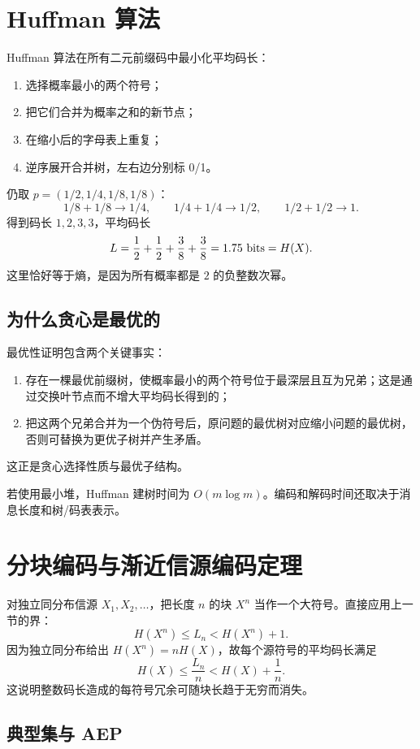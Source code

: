 \section{Huffman 算法}

Huffman 算法在所有二元前缀码中最小化平均码长：
\begin{enumerate}
  \item 选择概率最小的两个符号；
  \item 把它们合并为概率之和的新节点；
  \item 在缩小后的字母表上重复；
  \item 逆序展开合并树，左右边分别标 0/1。
\end{enumerate}

\begin{example}[完整 Huffman 计算]
仍取 $p=(1/2,1/4,1/8,1/8)$：
\[
1/8+1/8\to1/4,
\qquad
1/4+1/4\to1/2,
\qquad
1/2+1/2\to1.
\]
得到码长 $1,2,3,3$，平均码长
\[
L=\frac12+\frac12+\frac38+\frac38=1.75\text{ bits}=H(X).
\]
这里恰好等于熵，是因为所有概率都是 $2$ 的负整数次幂。
\end{example}

\subsection{为什么贪心是最优的}

最优性证明包含两个关键事实：
\begin{enumerate}
  \item 存在一棵最优前缀树，使概率最小的两个符号位于最深层且互为兄弟；这是通过交换叶节点而不增大平均码长得到的；
  \item 把这两个兄弟合并为一个伪符号后，原问题的最优树对应缩小问题的最优树，否则可替换为更优子树并产生矛盾。
\end{enumerate}
这正是贪心选择性质与最优子结构。

若使用最小堆，Huffman 建树时间为 $O(m\log m)$。编码和解码时间还取决于消息长度和树/码表表示。

\section{分块编码与渐近信源编码定理}

对独立同分布信源 $X_1,X_2,\dots$，把长度 $n$ 的块 $X^n$ 当作一个大符号。直接应用上一节的界：
\[
H(X^n)\le L_n<H(X^n)+1.
\]
因为独立同分布给出 $H(X^n)=nH(X)$，故每个源符号的平均码长满足
\[
H(X)\le\frac{L_n}{n}<H(X)+\frac1n.
\]
这说明整数码长造成的每符号冗余可随块长趋于无穷而消失。

\subsection{典型集与 AEP}

